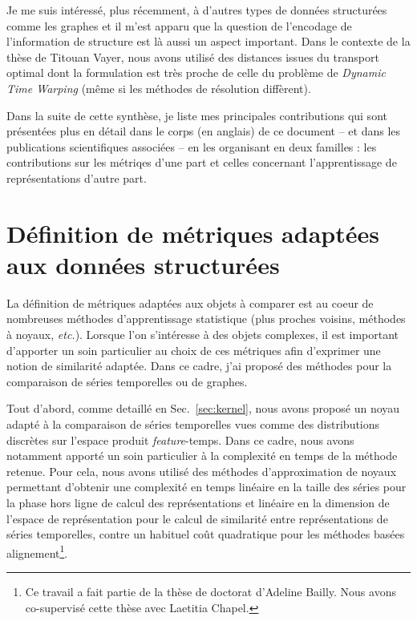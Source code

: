 Je me suis intéressé, plus récemment, à d'autres types de données structurées
comme les graphes et il m'est apparu que la question de l'encodage de
l'information de structure est là aussi un aspect important.
Dans le contexte de la thèse de Titouan Vayer, nous avons utilisé des
distances issues du transport optimal dont la formulation est très proche de
celle du problème de \emph{Dynamic Time Warping} (même si les méthodes de
résolution diffèrent).

Dans la suite de cette synthèse, je liste mes principales contributions
qui sont présentées plus en détail dans le corps (en anglais) de ce document
-- et dans les publications scientifiques associées -- en les organisant en
deux familles : les contributions sur les métriqes d'une part et celles
concernant l'apprentissage de représentations d'autre part.

\section*{Définition de métriques adaptées aux données structurées}

La définition de métriques adaptées aux objets à comparer est au coeur de
nombreuses méthodes d'apprentissage statistique (plus proches voisins,
méthodes à noyaux, \emph{etc.}).
Lorsque l'on s'intéresse à des objets complexes, il est important d'apporter
un soin particulier au choix de ces métriques afin d'exprimer une notion
de similarité adaptée.
Dans ce cadre, j'ai proposé des méthodes pour la comparaison de séries
temporelles ou de graphes.

\haveabreak{}

Tout d'abord, comme detaillé en Sec.~\ref{sec:kernel}, nous avons proposé un
noyau adapté à la comparaison de séries temporelles vues comme des
distributions discrètes sur l'espace produit \emph{feature}-temps.
Dans ce cadre, nous avons notamment apporté un soin particulier à la complexité
en temps de la méthode retenue.
Pour cela, nous avons utilisé des méthodes d'approximation de noyaux permettant
d'obtenir une complexité en temps linéaire en la taille des séries pour la phase
hors ligne de calcul des représentations et linéaire en la dimension de l'espace
de représentation pour le calcul de similarité entre représentations de séries
temporelles, contre un habituel coût quadratique pour les méthodes basées
alignement\footnote{Ce travail a fait partie de la thèse de doctorat d'Adeline
Bailly. Nous avons co-supervisé cette thèse avec Laetitia Chapel.}.

